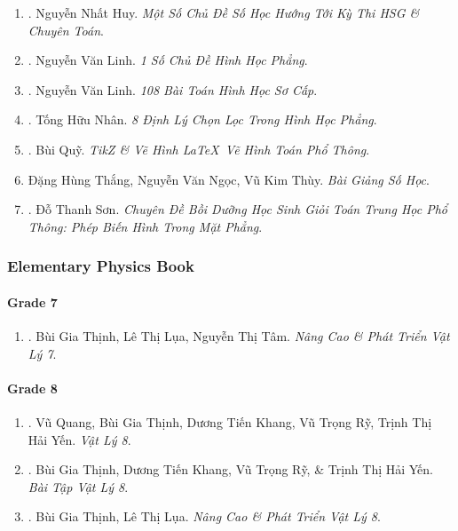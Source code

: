 \documentclass{article}
\begin{document}
\begin{enumerate}
	\item \cite{Huy_so_hoc}. Nguyễn Nhất Huy. {\it Một Số Chủ Đề Số Học Hướng Tới Kỳ Thi HSG \& Chuyên Toán}.\hfill{\sf[reading]}
	\item \cite{Linh_topic_geometry}. Nguyễn Văn Linh. {\it 1 Số Chủ Đề Hình Học Phẳng}.\hfill{\sf[reading]}
	\item \cite{Linh_108_geometry}. Nguyễn Văn Linh. {\it 108 Bài Toán Hình Học Sơ Cấp}.\hfill{\sf[reading]}
	\item \cite{Nhan_8_geometry_theorem}. Tống Hữu Nhân. {\it 8 Định Lý Chọn Lọc Trong Hình Học Phẳng}.\hfill{\sf[reading]}
	\item \cite{Quy2022}. Bùi Quỹ. {\it TikZ \& Vẽ Hình \LaTeX\ Vẽ Hình Toán Phổ Thông}.\hfill{\sf[reading]}
	\item Đặng Hùng Thắng, Nguyễn Văn Ngọc, Vũ Kim Thùy. {\it Bài Giảng Số Học}.
	\item \cite{Son2006}. Đỗ Thanh Sơn. {\it Chuyên Đề Bồi Dưỡng Học Sinh Giỏi Toán Trung Học Phổ Thông: Phép Biến Hình Trong Mặt Phẳng}.\hfill{\sf[reading]}	
\end{enumerate}

\subsubsection{Elementary Physics Book}

\paragraph{Grade 7}

\begin{enumerate}
	\item \cite{Thinh_Lua_ncpt_Vat_Ly_7}. Bùi Gia Thịnh, Lê Thị Lụa, Nguyễn Thị Tâm. {\it Nâng Cao \& Phát Triển Vật Lý 7}.\hfill{\sf[reading]}
\end{enumerate}

\paragraph{Grade 8}

\begin{enumerate}
	\item \cite{SGK_Vat_Ly_8}. Vũ Quang, Bùi Gia Thịnh, Dương Tiến Khang, Vũ Trọng Rỹ, Trịnh Thị Hải Yến. {\it Vật Lý 8}.\hfill{\sf[reading]}
	\item \cite{SBT_Vat_Ly_8}. Bùi Gia Thịnh, Dương Tiến Khang, Vũ Trọng Rỹ, \& Trịnh Thị Hải Yến. {\it Bài Tập Vật Lý 8}.\hfill{\sf[reading]}
	\item \cite{Thinh_Lua_ncpt_Vat_Ly_8}. Bùi Gia Thịnh, Lê Thị Lụa. {\it Nâng Cao \& Phát Triển Vật Lý 8}.\hfill{\sf[reading]}
\end{enumerate}
\end{document}
